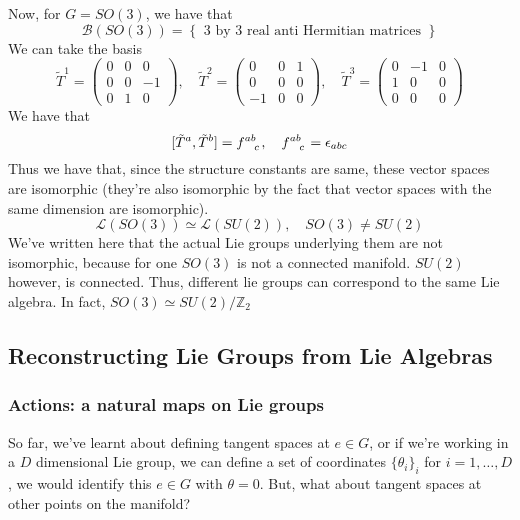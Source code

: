 \documentclass[11pt, oneside]{article}   	%
\theoremstyle{slanted}
\begin{document}
Now, for $ G = SO ( 3) $, 
we have that 
 \[
	 \mathcal{ B  } ( SO ( 3) )  = \left\{  \text{ 3 by 3 real anti Hermitian matrices }  \right\} 
\]  We can take the basis
\[
	\tilde{ T }^ 1 = \begin{pmatrix} 0 & 0 & 0 \\ 0 & 0 & - 1 \\ 0 & 1 & 0  \end{pmatrix}, \quad \tilde { T }^ 2 = \begin{pmatrix} 0 & 0 & 1 \\ 0 & 0 & 0 \\ -1 & 0 & 0  \end{pmatrix}, \quad \tilde{ T } ^ 3 = \begin{pmatrix} 0 & -1 & 0 \\ 1 & 0 & 0 \\ 0 & 0 & 0  \end{pmatrix}   
\] We have that 
\[
[ \tilde{ T }^ a , \tilde { T  } ^ b ] =  f \indices{ ^ { ab } _ c }, \quad f \indices{ ^{ ab } _ c } = \epsilon_{ abc }  
\] Thus we have that, since the structure constants are same,
these vector spaces are isomorphic (they're also isomorphic 
by the fact that vector spaces with the same dimension are isomorphic). 
\[
	\mathcal{ L  } ( SO ( 3 )) \simeq \mathcal{ L } ( SU ( 2) ), \quad SO ( 3) \neq SU ( 2) 
\] We've written here that the actual Lie groups underlying them 
are not isomorphic, because for one $ SO ( 3) $ 
is not a connected manifold. $ SU ( 2) $ however, 
is connected. 
Thus, different lie groups can correspond to the same Lie algebra. In fact, $ SO ( 3) \simeq SU ( 2) / \mathbb{ Z }_2 $


\pagebreak
\subsection{Reconstructing Lie Groups from Lie Algebras} 

\subsubsection{Actions: a natural maps on Lie groups} 
So far, we've learnt about defining tangent spaces at $e \in G$, or if we're working in a $D$ dimensional Lie group, we can define a set of coordinates $\{ \theta_i \}_i$ for $i = 1, \dots, D$, we would identify this $e \in G$ with $\theta = 0$. But, what about tangent spaces at other points on the manifold?
\end{document}
